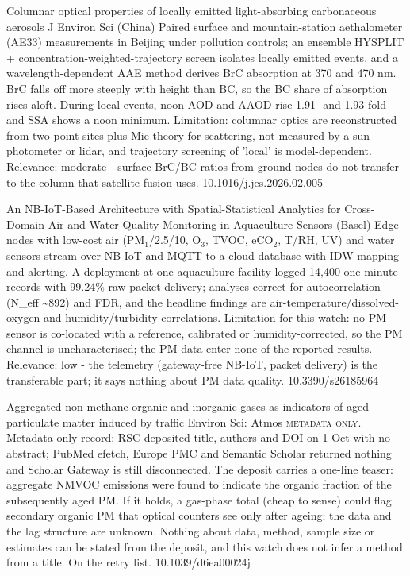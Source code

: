 \documentclass[10pt]{article}
\begin{document}
{Columnar optical properties of locally emitted light-absorbing carbonaceous aerosols}
{J Environ Sci (China)}
{Paired surface and mountain-station aethalometer (AE33) measurements in Beijing under pollution controls; an ensemble HYSPLIT + concentration-weighted-trajectory screen isolates locally emitted events, and a wavelength-dependent AAE method derives BrC absorption at 370 and 470 nm. BrC falls off more steeply with height than BC, so the BC share of absorption rises aloft. During local events, noon AOD and AAOD rise 1.91- and 1.93-fold and SSA shows a noon minimum. Limitation: columnar optics are reconstructed from two point sites plus Mie theory for scattering, not measured by a sun photometer or lidar, and trajectory screening of 'local' is model-dependent. Relevance: moderate - surface BrC/BC ratios from ground nodes do not transfer to the column that satellite fusion uses.}
{10.1016/j.jes.2026.02.005}

{An NB-IoT-Based Architecture with Spatial-Statistical Analytics for Cross-Domain Air and Water Quality Monitoring in Aquaculture}
{Sensors (Basel)}
{Edge nodes with low-cost air (PM$_{1}$/2.5/10, O$_3$, TVOC, eCO$_2$, T/RH, UV) and water sensors stream over NB-IoT and MQTT to a cloud database with IDW mapping and alerting. A deployment at one aquaculture facility logged 14,400 one-minute records with 99.24\% raw packet delivery; analyses correct for autocorrelation (N\_eff \textasciitilde{}892) and FDR, and the headline findings are air-temperature/dissolved-oxygen and humidity/turbidity correlations. Limitation for this watch: no PM sensor is co-located with a reference, calibrated or humidity-corrected, so the PM channel is uncharacterised; the PM data enter none of the reported results. Relevance: low - the telemetry (gateway-free NB-IoT, packet delivery) is the transferable part; it says nothing about PM data quality.}
{10.3390/s26185964}

{Aggregated non-methane organic and inorganic gases as indicators of aged particulate matter induced by traffic}
{Environ Sci: Atmos}
{\textsc{metadata only.} Metadata-only record: RSC deposited title, authors and DOI on 1 Oct with no abstract; PubMed efetch, Europe PMC and Semantic Scholar returned nothing and Scholar Gateway is still disconnected. The deposit carries a one-line teaser: aggregate NMVOC emissions were found to indicate the organic fraction of the subsequently aged PM. If it holds, a gas-phase total (cheap to sense) could flag secondary organic PM that optical counters see only after ageing; the data and the lag structure are unknown. Nothing about data, method, sample size or estimates can be stated from the deposit, and this watch does not infer a method from a title. On the retry list.}
{10.1039/d6ea00024j}
\end{document}
